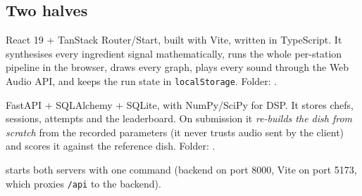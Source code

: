 \documentclass[11pt,a4paper]{article}
\begin{document}
\subsection{Two halves}
\begin{description}[style=nextline,leftmargin=0.6cm]
\item[Frontend (what the player sees and hears)] React 19 + TanStack Router/Start,
  built with Vite, written in TypeScript. It synthesises every ingredient signal
  mathematically, runs the whole per-station pipeline in the browser, draws every
  graph, plays every sound through the Web Audio API, and keeps the run state in
  \texttt{localStorage}. Folder: .
\item[Backend (the authoritative judge)] FastAPI + SQLAlchemy + SQLite, with NumPy/SciPy
  for DSP. It stores chefs, sessions, attempts and the leaderboard. On submission it
  \emph{re-builds the dish from scratch} from the recorded parameters (it never trusts
  audio sent by the client) and scores it against the reference dish. Folder:
  .
\item[Runner]  starts both servers with one command (backend on port 8000,
  Vite on port 5173, which proxies \texttt{/api} to the backend).
\end{description}
\end{document}
